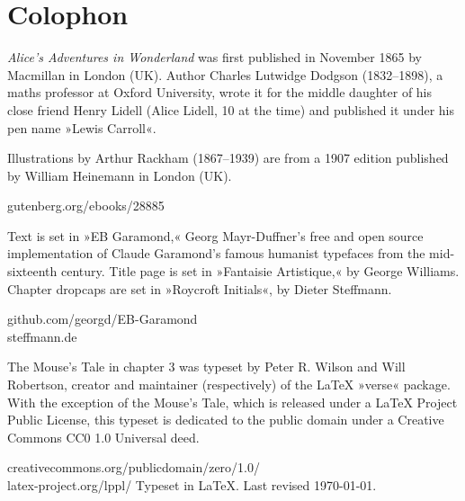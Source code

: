 \documentclass[
a5paper,
]{scrbook}
\begin{document}
\chapter*{Colophon}

\centering

\vfill
\begin{minipage}{\textwidth}
\textit{Alice's Adventures in Wonderland} was first published in November 1865 by Macmillan in London (UK). Author Charles Lutwidge Dodgson (1832--1898), a maths professor at Oxford University, wrote it for the middle daughter of his close friend Henry Lidell (Alice Lidell, 10 at the time) and published it under his pen name »Lewis Carroll«.

\indent Illustrations by Arthur Rackham (1867--1939) are from a 1907 edition published by William Heinemann in London (UK).
\end{minipage}
\vfill
gutenberg.org/ebooks/28885
\vfill
\divider
\vfill
\begin{minipage}{\textwidth}
Text is set in »EB Garamond,« Georg Mayr-Duffner's free and open source implementation of Claude Garamond’s famous humanist typefaces from the mid-sixteenth century. Title page is set in »Fantaisie Artistique,« by George Williams. Chapter dropcaps are set in »Roycroft Initials«, by Dieter Steffmann.
\end{minipage}
\vfill
github.com/georgd/EB-Garamond\\steffmann.de
\vfill
\divider
\vfill
\begin{minipage}{\textwidth}
The Mouse's Tale in chapter 3 was typeset by Peter R. Wilson and Will Robertson, creator and maintainer (respectively) of the \LaTeX{} »verse« package. With the exception of the Mouse's Tale, which is released under a \LaTeX{} Project Public License, this typeset is dedicated to the public domain under a Creative Commons CC0 1.0 Universal deed. 
\end{minipage}
\vfill
creativecommons.org/publicdomain/zero/1.0/\\latex-project.org/lppl/
\vfill
\divider
\vfill
Typeset in \LaTeX{}. Last revised \today.
\thispagestyle{empty}
\end{document}
